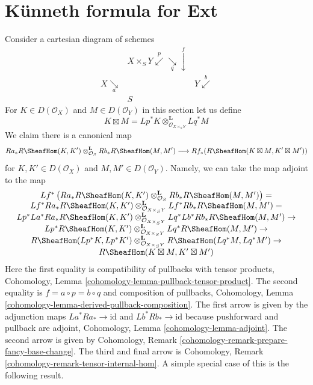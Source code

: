 \section{K\"unneth formula for Ext}
\label{perfect-section-kunneth-Ext}
Consider a cartesian diagram of schemes
$$
\begin{array}{ccc} & X \times_S Y \overset{p}{\swarrow}\underset{q}{\searrow}\overset{f}{\downarrow} &  \\ X \underset{a}{\searrow} &  & Y \overset{b}{\swarrow} \\  & S & \end{array}
$$
For $K \in D(\mathcal{O}_X)$ and $M \in D(\mathcal{O}_Y)$
in this section let us define
$$
K \boxtimes M =
Lp^*K \otimes_{\mathcal{O}_{X \times_S Y}}^\mathbf{L} Lq^*M
$$
We claim there is a canonical map
\begin{equation}
\label{equation-kunneth-ext}
Ra_*R\SheafHom(K, K')
\otimes_{\mathcal{O}_S}^\mathbf{L}
Rb_*R\SheafHom(M, M')
\longrightarrow
Rf_*(R\SheafHom(K \boxtimes M, K' \boxtimes M'))
\end{equation}
for $K, K' \in D(\mathcal{O}_X)$ and $M, M' \in D(\mathcal{O}_Y)$.
Namely, we can take the map adjoint to the map
$$
\begin{matrix}
Lf^*\left(Ra_*R\SheafHom(K, K')
\otimes_{\mathcal{O}_S}^\mathbf{L}
Rb_* R\SheafHom(M, M')\right) = \\
Lf^* Ra_* R\SheafHom(K, K')
\otimes_{\mathcal{O}_{X \times_S Y}}^\mathbf{L}
Lf^* Rb_* R\SheafHom(M, M') = \\
Lp^* La^* Ra_* R\SheafHom(K, K')
\otimes_{\mathcal{O}_{X \times_S Y}}^\mathbf{L}
Lq^* Lb^* Rb_* R\SheafHom(M, M') \to \\
Lp^* R\SheafHom(K, K')
\otimes_{\mathcal{O}_{X \times_S Y}}^\mathbf{L}
Lq^* R\SheafHom(M, M') \to \\
R\SheafHom(Lp^*K, Lp^*K')
\otimes_{\mathcal{O}_{X \times_S Y}}^\mathbf{L}
R\SheafHom(Lq^*M, Lq^*M') \to \\
R\SheafHom(K \boxtimes M, K' \boxtimes M')
\end{matrix}
$$
Here the first equality is compatibility of pullbacks with tensor products,
Cohomology, Lemma \ref{cohomology-lemma-pullback-tensor-product}.
The second equality is $f = a \circ p = b \circ q$ and
composition of pullbacks,
Cohomology, Lemma \ref{cohomology-lemma-derived-pullback-composition}.
The first arrow is given by the adjunction maps
$La^* Ra_* \to \text{id}$ and
$Lb^* Rb_* \to \text{id}$ because pushforward and pullback are adjoint,
Cohomology, Lemma \ref{cohomology-lemma-adjoint}.
The second arrow is given by
Cohomology, Remark \ref{cohomology-remark-prepare-fancy-base-change}.
The third and final arrow is
Cohomology, Remark \ref{cohomology-remark-tensor-internal-hom}.
A simple special case of this is the following result.

